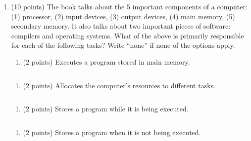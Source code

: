 \begin{enumerate}
\def\labelenumi{\arabic{enumi}.}
\setcounter{enumi}{6}
\item
  (10 points) The book talks about the 5 important components of a
  computer: (1) processor, (2) input devices, (3) output devices, (4)
  main memory, (5) secondary memory. It also talks about two important
  pieces of software: compilers and operating systems. What of the above
  is primarily responsible for each of the following tasks? Write
  ``none'' if none of the options apply.

  \begin{enumerate}
  \def\labelenumii{\alph{enumii}.}
  \tightlist
  \item
    (2 points) Executes a program stored in main memory.
  \end{enumerate}

\begin{verbatim}

\end{verbatim}

  \begin{enumerate}
  \def\labelenumii{\alph{enumii}.}
  \setcounter{enumii}{1}
  \tightlist
  \item
    (2 points) Allocates the computer's resources to different tasks.
  \end{enumerate}

\begin{verbatim}

\end{verbatim}

  \begin{enumerate}
  \def\labelenumii{\alph{enumii}.}
  \setcounter{enumii}{2}
  \tightlist
  \item
    (2 points) Stores a program while it is being executed.
  \end{enumerate}

\begin{verbatim}

\end{verbatim}

  \begin{enumerate}
  \def\labelenumii{\alph{enumii}.}
  \setcounter{enumii}{3}
  \tightlist
  \item
    (2 points) Stores a program when it is not being executed.
  \end{enumerate}

\begin{verbatim}


\end{verbatim}
\end{enumerate}
